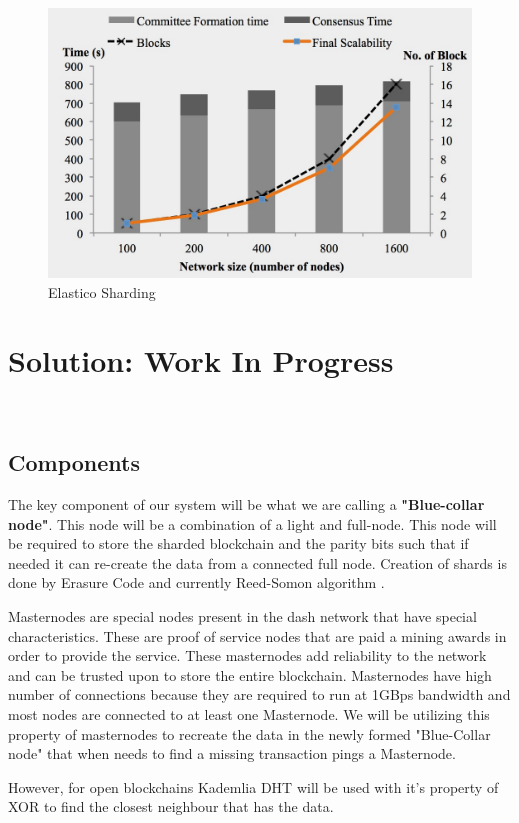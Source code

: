 \documentclass[conference]{IEEEtran}
\begin{document}
\begin{figure}
    \includegraphics[width=.8\columnwidth]{files/elasticoRes.png}
    \centering
    \caption{Elastico Sharding }
    \label{image: fig2}
\end{figure}
 
\section{Solution: Work In Progress}
\\
\subsection{Components}
The key component of our system will be what we are calling a
\textbf{"Blue-collar node"}.
This node will be a combination of a light and full-node. This node will be
required to store the sharded blockchain and the parity bits such that if needed
it can re-create the data from a connected full node. Creation of shards is done by Erasure Code \cite{erasure}
and currently Reed-Somon algorithm \cite{reed}.

Masternodes are special nodes present in the dash network that have special characteristics.
These are proof of service nodes that are paid a mining awards in order to provide the service.
These masternodes add reliability to the network and can be trusted upon to store the entire blockchain.
Masternodes have high number of connections because they are required to run at 1GBps bandwidth and
most nodes are connected to at least one Masternode.
We will be utilizing this property of masternodes to recreate the data in the newly formed
"Blue-Collar node" that when needs to find a missing transaction pings a Masternode.

However, for open blockchains Kademlia DHT will be used with it's property of 
XOR to find the closest neighbour that has the data.
\end{document}
